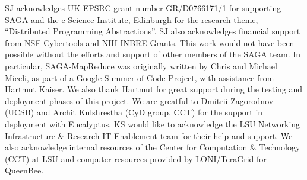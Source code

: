 \documentclass[conference,final]{IEEEtran}
\newcommand{\sagamapreduce }{SAGA-MapReduce }
\begin{document}
SJ acknowledges UK EPSRC grant number GR/D0766171/1 for supporting
SAGA and the e-Science Institute, Edinburgh for the research theme,
``Distributed Programming Abstractions''.  SJ also acknowledges
financial support from NSF-Cybertools and NIH-INBRE Grants. This work
would not have been possible without the efforts and support of other
members of the SAGA team.  In particular, \sagamapreduce was
originally written by Chris and Michael Miceli, as part of a Google
Summer of Code Project, with assistance from Hartmut Kaiser. We also
thank Hartmut for great support during the testing and deployment
phases of this project. We are greatful to Dmitrii Zagorodnov (UCSB)
and Archit Kulshrestha (CyD group, CCT) for the support in deployment
with Eucalyptus.  KS would like to acknowledge the LSU Networking
Infrastructure \& Research IT Enablement team for their help and
support.  We also acknowledge internal resources of the Center for
Computation \& Technology (CCT) at LSU and computer resources provided
by LONI/TeraGrid for QueenBee.  

\end{document}
